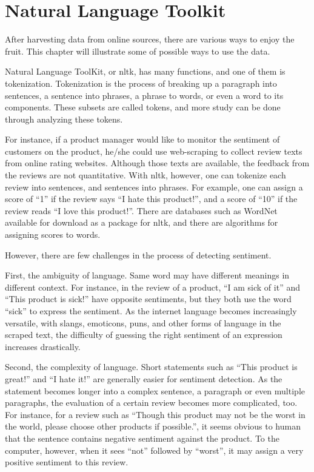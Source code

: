 \documentclass[12pt]{report}
\begin{document}
\section{Natural Language Toolkit}
After harvesting data from online sources, there are various ways to enjoy the fruit. This chapter will illustrate some of possible ways to use the data.

Natural Language ToolKit, or \gls{nltk}, has many functions, and one of them is tokenization. Tokenization is the process of breaking up a paragraph into sentences, a sentence into phrases, a phrase to words, or even a word to its components. These subsets are called tokens, and more study can be done through analyzing these tokens.

For instance, if a product manager would like to monitor the sentiment of customers on the product, he/she could use web-scraping to collect review texts from online rating websites. Although those texts are available, the feedback from the reviews are not quantitative. With \gls{nltk}, however, one can tokenize each review into sentences, and sentences into phrases. For example, one can assign a score of ``1'' if the review says ``I hate this product!'', and a score of ``10'' if the review reads ``I love this product!''. There are databases such as WordNet available for download as a package for \gls{nltk}, and there are algorithms for assigning scores to words.

However, there are few challenges in the process of detecting sentiment. 

First, the ambiguity of language. Same word may have different meanings in different context. For instance, in the review of a product, ``I am sick of it'' and ``This product is sick!'' have opposite sentiments, but they both use the word ``sick'' to express the sentiment. As the internet language becomes increasingly versatile, with slangs, emoticons, puns, and other forms of language in the scraped text, the difficulty of guessing the right sentiment of an expression increases drastically.

Second, the complexity of language. Short statements such as ``This product is great!'' and ``I hate it!'' are generally easier for sentiment detection. As the statement becomes longer into a complex sentence, a paragraph or even multiple paragraphs, the evaluation of a certain review becomes more complicated, too. For instance, for a review such as ``Though this product may not be the worst in the world, please choose other products if possible.'', it seems obvious to human that the sentence contains negative sentiment against the product. To the computer, however, when it sees ``not'' followed by ``worst'', it may assign a very positive sentiment to this review.
\end{document}
